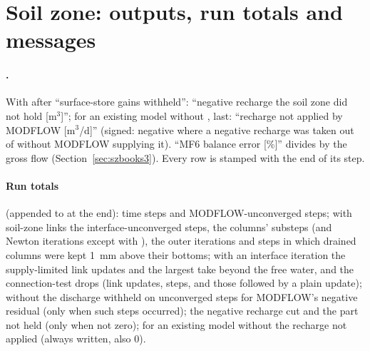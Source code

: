 \section{Soil zone: outputs, run totals and messages}\label{app:szv3}
\paragraph{.} With  after ``surface-store gains withheld'': ``negative recharge the soil
zone did not hold [m$^3$]''; for an existing model without , last: ``recharge not applied by MODFLOW [m$^3$/d]''
(signed: negative where a negative recharge was taken out of  without MODFLOW supplying it). ``MF6 balance error
[\%]'' divides by the gross flow (Section~\ref{sec:szbooks3}). Every row is stamped with the end of its step.

\paragraph{Run totals} (appended to  at the end): time steps and MODFLOW-unconverged steps; with
soil-zone links the interface-unconverged steps, the columns' substeps (and Newton iterations except with ), the outer
iterations and steps in which drained columns were kept 1~mm above their bottoms; with an interface iteration the
supply-limited link updates and the largest take beyond the free water, and the connection-test drops (link updates, steps,
and those followed by a plain update); without  the discharge withheld on unconverged steps for
MODFLOW's negative residual (only when such steps occurred); the negative recharge cut and the part not held (only when not zero); for an existing
model without  the recharge not applied (always written, also 0).

